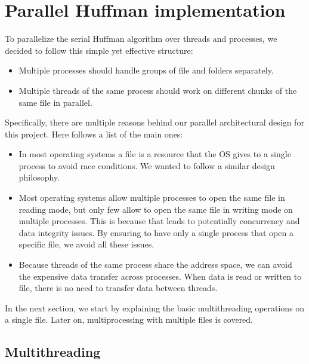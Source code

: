 \section{Parallel Huffman implementation}
To parallelize the serial Huffman algorithm over threads and processes, we decided to follow this simple yet effective structure:
\begin{itemize}
    \item Multiple processes should handle groups of file and folders separately.
    \item Multiple threads of the same process should work on different chunks of the same file in parallel.
\end{itemize}
Specifically, there are multiple reasons behind our parallel architectural design for this project. Here follows a list of the main ones:
\begin{itemize}
	\item In most operating systems a file is a resource that the OS gives to a single process to avoid race conditions. We wanted to follow a similar design philosophy.
	\item Most operating systems allow multiple processes to open the same file in reading mode, but only few allow to open the same file in writing mode on multiple processes. This is because that leads to potentially concurrency and data integrity issues. By ensuring to have only a single process that open a specific file, we avoid all these issues.
	\item Because threads of the same process share the address space, we can avoid the expensive data transfer across processes. When data is read or written to file, there is no need to transfer data between threads.
\end{itemize}
In the next section, we start by explaining the basic multithreading operations on a single file. Later on, multiprocessing with multiple files is covered.

\subsection{Multithreading}

